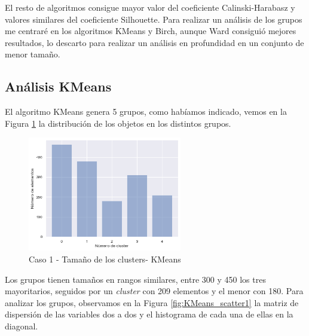 \documentclass[a4paper, 20pt]{article}
\begin{document}
El resto de algoritmos consigue mayor valor del coeficiente Calinski-Harabasz y valores similares del coeficiente Silhouette. Para realizar un análisis de los grupos me centraré en los algoritmos KMeans y Birch, aunque Ward consiguió mejores resultados, lo descarto para realizar un análisis en profundidad en un conjunto de menor tamaño.

\subsection{Análisis KMeans}

El algoritmo KMeans genera 5 grupos, como habíamos indicado, vemos en la Figura \ref{fig:KMeans_tam1} la distribución de los objetos en los distintos grupos.

\begin{figure}[H]
    \centering
    \includegraphics[width=0.6\textwidth]{./caso1/KMeans_tam_clusters}
    \caption{Caso 1 - Tamaño de los clusters- KMeans}
    \label{fig:KMeans_tam1}
\end{figure}

Los grupos tienen tamaños en rangos similares, entre 300 y 450 los tres mayoritarios, seguidos por un \textit{cluster} con 209 elementos y el menor con 180. Para analizar los grupos, observamos en la Figura \ref{fig:KMeans_scatter1} la matriz de dispersión de las variables dos a dos y el histograma de cada una de ellas en la diagonal.
\end{document}
